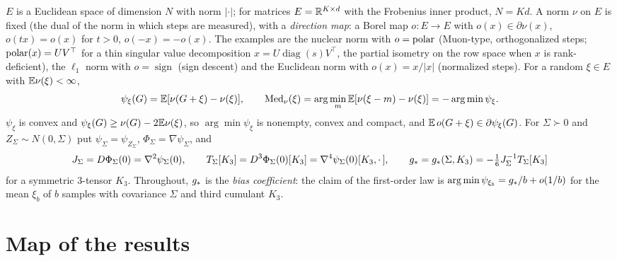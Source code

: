 \documentclass[10pt]{article}
\theoremstyle{definition}
\theoremstyle{remark}
\begin{document}
$E$ is a Euclidean space of dimension $N$ with norm $|\cdot|$; for matrices $E=\mathbb{R}^{K\times d}$ with the Frobenius inner
product, $N=Kd$. A norm $\nu$ on $E$ is fixed (the dual of the norm in which steps are measured), with a
\emph{direction map}: a Borel map $o:E\to E$ with $o(x)\in\partial\nu(x)$, $o(tx)=o(x)$ for $t>0$, $o(-x)=-o(x)$. The
examples are the nuclear norm with $o=\operatorname{polar}$ (Muon-type, orthogonalized steps; $\operatorname{polar}(x)=UV^\top$ for a thin singular
value decomposition $x=U\operatorname{diag}(s)V^\top$, the partial isometry on the row space when $x$ is rank-deficient),
the $\ell_1$ norm with $o=\operatorname{sign}$ (sign descent) and the Euclidean norm with $o(x)=x/|x|$ (normalized steps).
For a random $\xi\in E$ with $\mathbb{E}\nu(\xi)<\infty$,
\[
\psi_\xi(G)=\mathbb{E}[\nu(G+\xi)-\nu(\xi)],\qquad \operatorname{Med}_\nu(\xi)=\arg\min_{m}\mathbb{E}[\nu(\xi-m)-\nu(\xi)]=-\arg\min\psi_\xi .
\]
$\psi_\xi$ is convex and $\psi_\xi(G)\ge\nu(G)-2\mathbb{E}\nu(\xi)$, so $\arg\min\psi_\xi$ is nonempty, convex and compact, and
$\mathbb{E}\,o(G+\xi)\in\partial\psi_\xi(G)$. For $\Sigma\succ0$ and $Z_\Sigma\sim N(0,\Sigma)$ put $\psi_\Sigma=\psi_{Z_\Sigma}$,
$\Phi_\Sigma=\nabla\psi_\Sigma$, and
\[
J_\Sigma=D\Phi_\Sigma(0)=\nabla^2\psi_\Sigma(0),\qquad T_\Sigma[K_3]=D^3\Phi_\Sigma(0)[K_3]=\nabla^4\psi_\Sigma(0)[K_3,\cdot\,],\qquad
g_\ast=g_\ast(\Sigma,K_3)=-\tfrac16J_\Sigma^{-1}T_\Sigma[K_3]
\]
for a symmetric $3$-tensor $K_3$. Throughout, $g_\ast$ is the \emph{bias coefficient}: the claim of the first-order law is
$\arg\min\psi_{\xi_b}=g_\ast/b+o(1/b)$ for the mean $\xi_b$ of $b$ samples with covariance $\Sigma$ and third cumulant $K_3$.



\section{Map of the results}\label{sec:deps}
\end{document}
